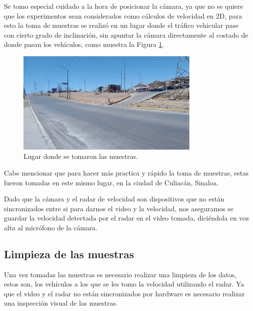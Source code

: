 Se tomo especial cuidado a la hora de posicionar la cámara, ya que no se quiere que los experimentos sean considerados como cálculos de velocidad en 2D, para esto la toma de muestras se realizó en un lugar donde el tráfico vehicular pase con cierto grado de inclinación, sin apuntar la cámara directamente al costado de donde pasan los vehículos, como muestra la Figura \ref{fig:LugarMuestrasDataset}.

\begin{figure}[H]
    \centering
    \includegraphics[width=0.8\textwidth]{Metodologia/imgs/LugarMuestras.jpg}
    \caption{Lugar donde se tomaron las muestras.}
    \label{fig:LugarMuestrasDataset}
\end{figure}

Cabe mencionar que para hacer más practica y rápido la toma de muestras, estas fueron tomadas en este mismo lugar, en la ciudad de Culiacán, Sinaloa.

Dado que la cámara y el radar de velocidad son dispositivos que no están sincronizados entre si para darnos el video y la velocidad, nos aseguramos se guardar la velocidad detectada por el radar en el video tomada, diciéndola en voz alta al micrófono de la cámara.


\subsection{Limpieza de las muestras}

Una vez tomadas las muestras es necesario realizar una limpieza de los datos, estos son, los vehículos a los que se les tomo la velocidad utilizando el radar. Ya que el video y el radar no están sincronizados por hardware es necesario realizar una inspección visual de las muestras.

